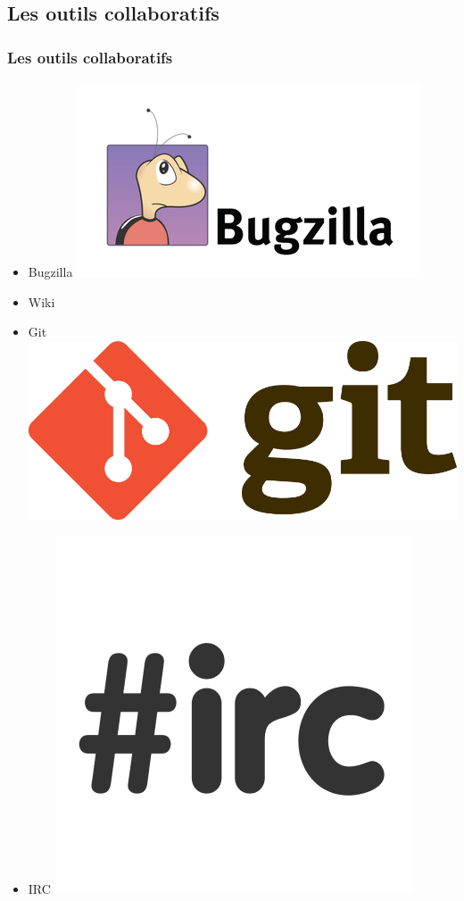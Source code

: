 \documentclass{beamer}
\begin{document}
\subsection{Les outils collaboratifs}
\begin{frame}
  \frametitle{Les outils collaboratifs}
  \begin{itemize}
  \item Bugzilla
    \includegraphics[scale=0.1]{images/bugzilla-logo.png}
  \item Wiki
  \item Git
    \includegraphics[scale=0.03]{images/git-logo.png}
  \item IRC
    \includegraphics[scale=0.07]{images/irc-logo.png}
  \end{itemize}
\end{frame}
\end{document}
